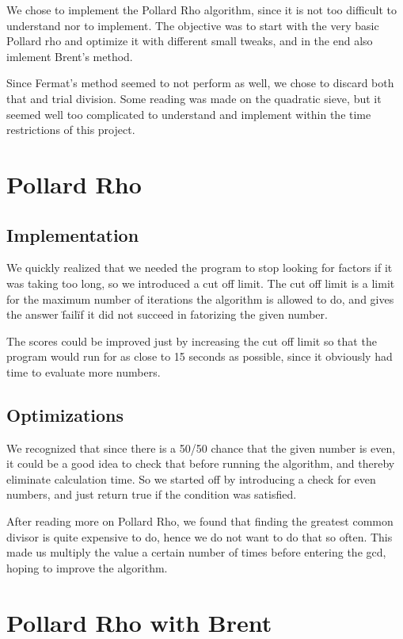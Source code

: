 \documentclass[a4paper, 12pt]{report}
\begin{document}
We chose to implement the Pollard Rho algorithm, since it is not too difficult to understand nor to implement. The objective was to start with the very basic Pollard rho and optimize it with different small tweaks, and in the end also imlement Brent's method.

Since Fermat's method seemed to not perform as well, we chose to discard both that and trial division. Some reading was made on the quadratic sieve, but it seemed well too complicated to understand and implement within the time restrictions of this project.

\section{Pollard Rho}
\subsection{Implementation}

We quickly realized that we needed the program to stop looking for factors if it was taking too long, so we introduced a cut off limit. The cut off limit is a limit for the maximum number of iterations the algorithm is allowed to do, and gives the answer \"fail\" if it did not succeed in fatorizing the given number. 

The scores could be improved just by increasing the cut off limit so that the program would run for as close to 15 seconds as possible, since it obviously had time to evaluate more numbers.

\subsection{Optimizations}
We recognized that since there is a 50/50 chance that the given number is even, it could be a good idea to check that before running the algorithm, and thereby eliminate calculation time. So we started off by introducing a check for even numbers, and just return true if the condition was satisfied.

After reading more on Pollard Rho, we found that finding the greatest common divisor is quite expensive to do, hence we do not want to do that so often. This made us multiply the value a certain number of times before entering the gcd, hoping to improve the algorithm.

\section{Pollard Rho with Brent}
\end{document}
